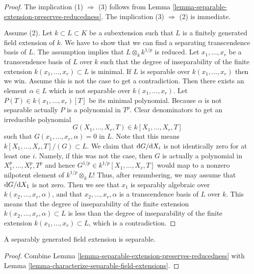 \begin{proof}
The implication (1) $\Rightarrow$ (3) follows from
Lemma \ref{lemma-separable-extension-preserves-reducedness}.
The implication (3) $\Rightarrow$ (2) is immediate.

\medskip\noindent
Assume (2). Let $k \subset L \subset K$ be a subextension such that
$L$ is a finitely generated field extension of $k$.
We have to show that we can find a separating transcendence basis of $L$.
The assumption implies that $L \otimes_k k^{1/p}$ is reduced.
Let $x_1, \ldots, x_r$ be a transcendence basis of $L$ over $k$ such
that the degree of inseparability of the finite extension
$k(x_1, \ldots, x_r) \subset L$ is minimal.
If $L$ is separable over $k(x_1, \ldots, x_r)$ then we win.
Assume this is not the case to get a contradiction.
Then there exists an element $\alpha \in L$ which is not
separable over $k(x_1, \ldots, x_r)$. Let $P(T) \in k(x_1, \ldots, x_r)[T]$
be its minimal polynomial. Because $\alpha$ is not separable
actually $P$ is a polynomial in $T^p$. Clear denominators
to get an irreducible polynomial
$$
G(X_1, \ldots, X_r, T) \in k[X_1, \ldots, X_r, T]
$$
such that $G(x_1, \ldots, x_r, \alpha) = 0$ in $L$.
Note that this means $k[X_1, \ldots, X_r, T]/(G) \subset L$.
We claim that ${\rm d}G/{\rm d}X_i$ is not identically zero
for at least one $i$. Namely, if this was not the case, then
$G$ is actually a polynomial in $X_1^p, \ldots, X_r^p, T^p$ and
hence $G^{1/p} \in k^{1/p}[X_1, \ldots, X_r, T]$ would map
to a nonzero nilpotent element of $k^{1/p}\otimes_k L$! Thus,
after renumbering, we may assume that ${\rm d}G/{\rm d}X_1$ is not zero.
Then we see that $x_1$ is separably algebraic over
$k(x_2, \ldots, x_r, \alpha)$, and that $x_2, \ldots, x_r, \alpha$
is a transcendence basis of $L$ over $k$. This means that
the degree of inseparability of the finite extension
$k(x_2, \ldots, x_r, \alpha) \subset L$ is less than the
degree of inseparability of the finite extension
$k(x_1, \ldots, x_r) \subset L$, which is a contradiction.
\end{proof}

\begin{lemma}
\label{lemma-separably-generated-separable}
A separably generated field extension is separable.
\end{lemma}

\begin{proof}
Combine Lemma \ref{lemma-separable-extension-preserves-reducedness}
with Lemma \ref{lemma-characterize-separable-field-extensions}.
\end{proof}

